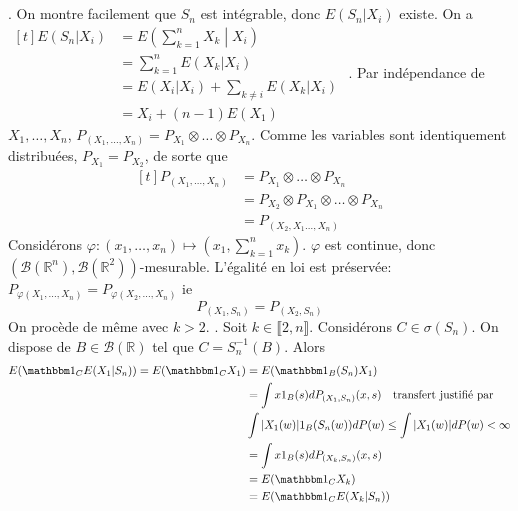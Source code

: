 \documentclass{report}
\begin{document}
\subsection{} \noindent{}\\ 
\\ 
\\
. On montre facilement que $S_n$ est intégrable, donc $E(S_n|X_i)$ existe. On a $\begin{aligned}[t]
E(S_n|X_i) &= E\left(\sum_{k=1}^nX_k \middle| X_i\right) \\
&= \sum_{k=1}^n E(X_k|X_i)\\
&= E(X_i|X_i) + \sum_{k\neq i}E(X_k|X_i)\\
&= X_i + (n-1)E(X_1)
\end{aligned}$ \newline 
{}. Par indépendance de $X_1,\ldots,X_n$, $P_{(X_1,\ldots,X_n)}=P_{X_1}\otimes\ldots \otimes P_{X_n} $. Comme les variables sont identiquement distribuées, $P_{X_1}=P_{X_2}$, de sorte que $$\begin{aligned}[t]
P_{(X_1,\ldots,X_n)}&=P_{X_1}\otimes\ldots \otimes P_{X_n} \\
&= P_{X_2}\otimes P_{X_1}\otimes \ldots \otimes P_{X_n} \\
&= P_{(X_2,X_1\ldots,X_n)}
\end{aligned}$$
Considérons $\varphi:(x_1,\ldots,x_n)\mapsto (x_1,\sum_{k=1}^n x_k)$. $\varphi$ est continue, donc $(\mathcal B(\mathbb R^n),\mathcal B(\mathbb R^2))$-mesurable. L'égalité en loi est préservée: $P_{\varphi(X_1,\ldots,X_n)} = P_{\varphi(X_2,\ldots,X_n)} $ ie $$P_{(X_1,S_n)}=P_{(X_2,S_n)}$$
On procède de même avec $k>2$.\newline
{}. Soit $k\in \llbracket 2,n \rrbracket$. Considérons $C\in \sigma(S_n)$. On dispose de $B\in \mathcal B(\mathbb R)$ tel que $C=S_n^{-1}(B)$. Alors $$\begin{aligned}[t]
E(\mathbbm 1_C E(X_1|S_n)) = E(\mathbbm 1_CX_1)&=E(\mathbbm 1_B(S_n)X_1) \\
&= \int x 1_B(s) dP_{(X_1,S_n)}(x,s) \quad \text{transfert justifié par }\\ &\int|X_1(w)|1_B(S_n(w)) dP(w)\leq \int|X_1(w)| dP(w)<\infty \\
&=\int x 1_B(s) dP_{(X_k,S_n)}(x,s) \\
&= E(\mathbbm 1_CX_k)\\
&= E(\mathbbm 1_C E(X_k|S_n))
\end{aligned}$$
\end{document}
